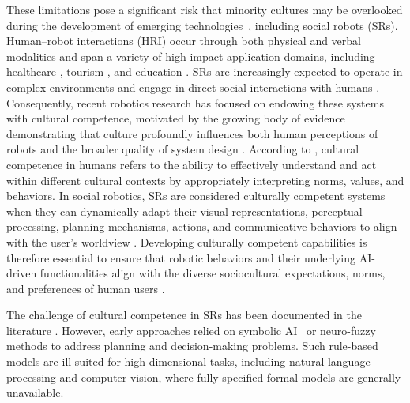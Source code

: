 These limitations pose a significant risk that minority cultures may be overlooked during the development of emerging technologies~\citep{not_uniform_data}, including social robots (SRs). 
Human–robot interactions (HRI) occur through both physical \citep{DESANTIS2008253, sharifi2021impedance} and verbal modalities \citep{verbalHRI} and span a variety of high-impact application domains, including healthcare \citep{HealthcareRobotics, ayari2020hybrid}, tourism \citep{tourismRobotics}, and education \citep{teachingRobotics}.
SRs are increasingly expected to operate in complex environments and engage in direct social interactions with humans \citep{sarrica2020many, henschel2021makes, AutonomousRobots, UserEngagementRobotics, Ray2008, 9143175, mccoll2016classifying}. 
Consequently, recent robotics research has focused on endowing these systems with cultural competence, motivated by the growing body of evidence demonstrating that culture profoundly influences both human perceptions of robots \citep{RobotCommunicating, Er04, Evers2008, Dingjun2010, Eresha2013, Joosse2014, Trovato2015, Mavrou2020, Andrist2015} and the broader quality of system design \citep{Jordan2022, Mohammed2015, PavingTheWayCulturallyCompetent}. 
According to \citep{Betancourt2003}, cultural competence in humans refers to the ability to effectively understand and act within different cultural contexts by appropriately interpreting norms, values, and behaviors. 
In social robotics, SRs are considered culturally competent systems when they can dynamically adapt their visual representations, perceptual processing, planning mechanisms, actions, and communicative behaviors to align with the user's worldview \citep{Papadopoulos2006, KnowledgeRepresentation}.
Developing culturally competent capabilities is therefore essential to ensure that robotic behaviors and their underlying AI-driven functionalities align with the diverse sociocultural expectations, norms, and preferences of human users \citep{Ray2008, Oneto2022}.

The challenge of cultural competence in SRs has been documented in the literature \citep{Bartneck2007, Rehm2013, Planning, GreetingSelection, Grassi_2022, CloudCultureDialogue, KnowledgeRepresentation, PavingTheWayCulturallyCompetent, Papadopoulos_CARESSES, papadopoulos2020caresses, 8673086}. 
However, early approaches relied on symbolic AI~\citep{PavingTheWayCulturallyCompetent, Bartneck2007, Rehm2013, Planning, Grassi_2022, CloudCultureDialogue, KnowledgeRepresentation} or neuro-fuzzy~\citep{bruno2016fuzzy} methods to address planning and decision-making problems. 
Such rule-based models are ill-suited for high-dimensional tasks, including natural language processing and computer vision, where fully specified formal models are generally unavailable.

